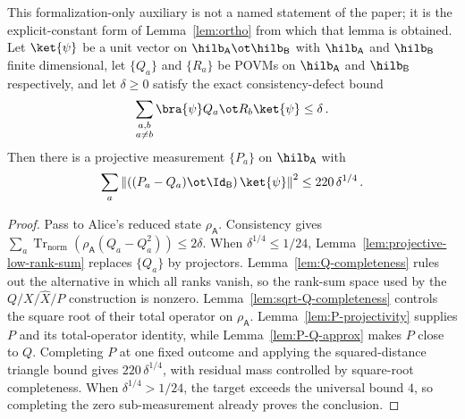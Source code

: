 \begin{lemma}
	\label{lem:ortho-explicit-constant}
	\leanok
	This formalization-only auxiliary is not a named statement of the paper; it is
	the explicit-constant form of Lemma~\ref{lem:ortho} from which that lemma is
	obtained. Let $\ket{\psi}$ be a unit vector on
	$\hilb_{\mathsf{A}} \ot \hilb_{\mathsf{B}}$ with $\hilb_{\mathsf{A}}$ and
	$\hilb_{\mathsf{B}}$ finite dimensional, let $\{Q_a\}$ and $\{R_a\}$ be POVMs
	on $\hilb_{\mathsf{A}}$ and $\hilb_{\mathsf{B}}$ respectively, and let
	$\delta \geq 0$ satisfy the exact consistency-defect bound
	\[
		\sum_{\substack{a,b \\ a \ne b}}
		\bra{\psi}
		Q_a \ot R_b \ket{\psi}
		\leq \delta\,.
	\]
	Then there is a projective measurement $\{P_a\}$ on $\hilb_{\mathsf{A}}$ with
	\[
		\sum_{a}
		\left\|\left((P_a-Q_a) \ot \Id_{\mathsf{B}}\right)\ket{\psi}\right\|^2
		\leq 220\,\delta^{1/4}\,.
	\]
\end{lemma}
\begin{proof}
	\leanok
	Pass to Alice's reduced state $\rho_{\mathsf A}$. Consistency gives
	$\sum_a \operatorname{Tr}_{\mathrm{norm}}\!\left(
	\rho_{\mathsf A}(Q_a-Q_a^2)\right) \leq 2\delta$.
	When $\delta^{1/4} \leq 1/24$, Lemma~\ref{lem:projective-low-rank-sum}
	replaces $\{Q_a\}$ by projectors. Lemma~\ref{lem:Q-completeness} rules out
	the alternative in which all ranks vanish, so the rank-sum space used by the
	$Q/X/\widehat X/P$ construction is nonzero. Lemma~\ref{lem:sqrt-Q-completeness}
	controls the square root of their total operator on $\rho_{\mathsf A}$.
	Lemma~\ref{lem:P-projectivity} supplies $P$ and its total-operator identity,
	while Lemma~\ref{lem:P-Q-approx} makes $P$ close to $Q$. Completing $P$ at one
	fixed outcome and applying the squared-distance triangle bound gives
	$220\,\delta^{1/4}$, with residual mass controlled by square-root completeness.
	When $\delta^{1/4} > 1/24$, the target exceeds the universal bound $4$, so
	completing the zero sub-measurement already proves the conclusion.
\end{proof}

